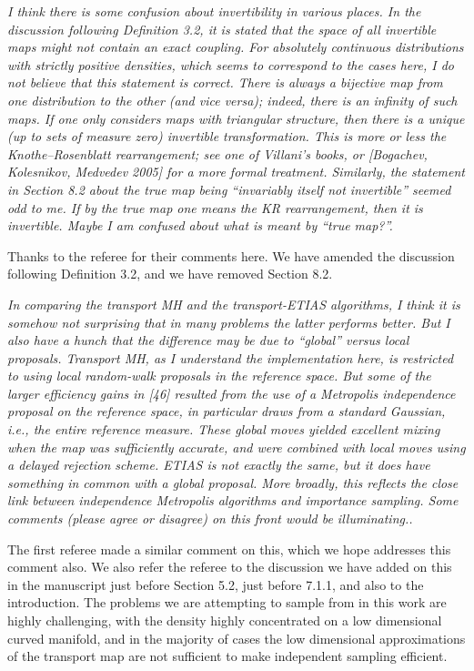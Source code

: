 \documentclass{article}
\newcommand{\comment}[2]{\vspace{0.6cm}{\bf Comment:} {\it #1.}

\vspace{0.3cm}{\bf Answer:} #2}
\begin{document}

\comment{I think there is some confusion about invertibility in various places.
In the discussion following Definition 3.2, it is stated that the space of all invertible maps might not contain an exact coupling. For absolutely continuous distributions with strictly positive densities, which seems to correspond to the cases here, I do not believe that this statement is correct. There is always a bijective map from one distribution to the other (and vice versa); indeed, there is an infinity of such maps. If one only considers maps with triangular structure, then there is a unique (up to sets of measure zero) invertible transformation. This is more or less the Knothe–Rosenblatt rearrangement; see one of Villani’s books, or [Bogachev, Kolesnikov, Medvedev 2005] for a more formal treatment.
Similarly, the statement in Section 8.2 about the true map being “invariably itself not invertible” seemed odd to me. If by the true map one means the KR rearrangement, then it is invertible. Maybe I am confused about what is meant by “true map?”}{Thanks to the referee for their comments here. We have amended the discussion following Definition 3.2, and we have removed Section 8.2.}


\comment{ In comparing the transport MH and the transport-ETIAS algorithms, I think it is somehow not surprising that in many problems the latter performs better. But I also have a hunch that the difference may be due to “global” versus local proposals. Transport MH, as I understand the implementation here, is restricted to using local random-walk proposals in the reference space. But some of the larger efficiency gains in [46] resulted from the use of a Metropolis independence proposal on the reference space, in particular draws from a standard Gaussian, i.e., the entire reference measure. These global moves yielded excellent mixing when the map was sufficiently accurate, and were combined with local moves using a delayed rejection scheme. ETIAS is not exactly the same, but it does have something in common with a global proposal. More broadly, this reflects the close link between independence Metropolis algorithms and importance sampling. Some comments (please agree or disagree) on this front would be illuminating.}{The first referee made a similar comment on this, which we hope addresses this comment also. We also refer the referee to the discussion we have added on this in the manuscript just before Section 5.2, just before 7.1.1, and also to the introduction. The problems we are attempting to sample from in this work are highly challenging, with the density highly concentrated on a low dimensional curved manifold, and in the majority of cases the low dimensional approximations of the transport map are not sufficient to make independent sampling efficient.}
\end{document}
